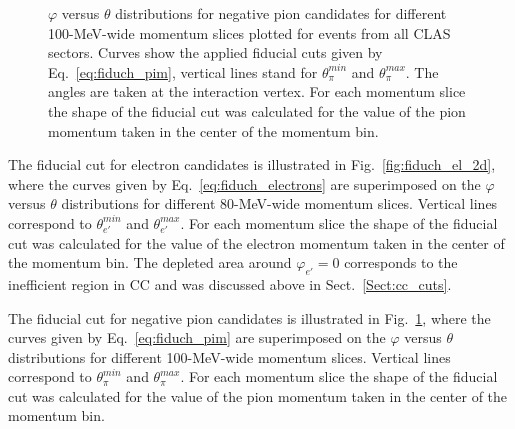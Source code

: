 \begin{figure}[htp]
\begin{center}
\caption{\small $\varphi$ versus $\theta$ distributions for negative pion candidates for different 100-MeV-wide momentum slices plotted for events from all CLAS sectors. Curves show the applied fiducial cuts given by Eq.~\eqref{eq:fiduch_pim}, vertical lines stand for $\theta_{\pi}^{min}$ and $\theta_{\pi}^{max}$. The angles are taken at the interaction vertex. For each momentum slice the shape of the fiducial cut was calculated for the value of the pion momentum taken in the center of the momentum bin. \label{fig:fiduch_pim_2d}}
\end{center}
\end{figure}


The fiducial cut for electron candidates is illustrated in Fig.~\ref{fig:fiduch_el_2d}, where the curves given by Eq.~\eqref{eq:fiduch_electrons} are superimposed on the $\varphi$ versus $\theta$ distributions for different 80-MeV-wide momentum slices. Vertical lines correspond to $\theta_{e'}^{min}$ and $\theta_{e'}^{max}$. For each momentum slice the shape of the fiducial cut was calculated for the value of the electron momentum taken in the center of the momentum bin. The depleted area around $\varphi_{e'} = 0$ corresponds to the inefficient region in CC and was discussed above in Sect.~\ref{Sect:cc_cuts}.  

The fiducial cut for negative pion candidates is illustrated in Fig.~\ref{fig:fiduch_pim_2d}, where the curves given by Eq.~\eqref{eq:fiduch_pim} are superimposed on the $\varphi$ versus $\theta$ distributions for different 100-MeV-wide momentum slices. Vertical lines correspond to $\theta_{\pi}^{min}$ and $\theta_{\pi}^{max}$. For each momentum slice the shape of the fiducial cut was calculated for the value of the pion momentum taken in the center of the momentum bin.

